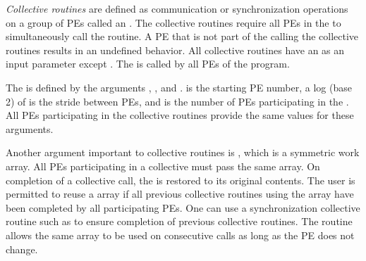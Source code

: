 
\emph{Collective routines} are defined as communication or synchronization operations 
on a group of \acp{PE} called an \activeset{}. The collective routines require all
\acp{PE} in the \activeset{} to simultaneously call the routine. 
A \ac{PE} that is not part of the \activeset{} calling the collective 
routines results in an undefined behavior.  All
collective routines have an \activeset{} as an input parameter except
\barrierall{}. The \barrierall{} is called by all \acp{PE} of the \openshmem{} program. 

The \activeset{} is defined by the arguments , , 
and .   is the starting \ac{PE} number, a log (base
2) of  is the stride between \acp{PE}, and  is
the number of \acp{PE} participating in the \activeset{}.  All \acp{PE} participating in the 
collective routines provide the same values for these arguments. 
 
Another argument important to collective routines is , which is a
symmetric work array.  All \acp{PE} participating in a collective must pass the same
 array.  On completion of a collective call, the  is restored to its 
original contents.  The user is permitted to reuse a  array if
all previous collective routines using the  array have been completed by all participating 
\acp{PE}.  One can use a synchronization collective routine such as \barrier{}
to ensure completion of previous collective routines. The  routine allows the same  array to be used on consecutive calls as long as the \ac{PE} \activeset{} does not change. 

%


